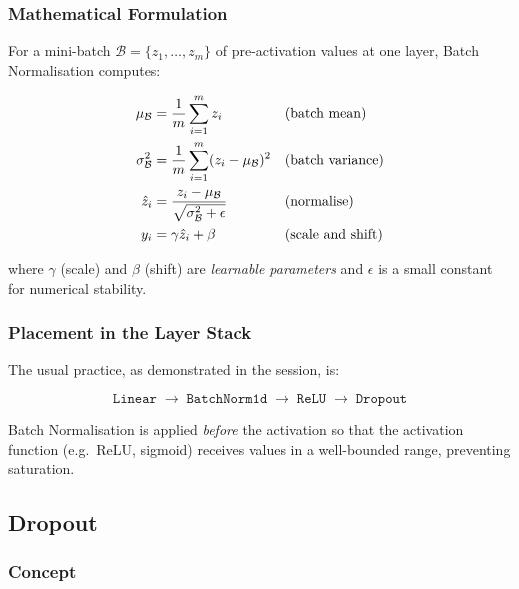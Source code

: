 \documentclass[12pt,a4paper]{article}
\begin{document}
\subsubsection{Mathematical Formulation}
\label{sec:regularisation:batchnorm:math}

For a mini-batch $\mathcal{B} = \{z_1, \ldots, z_m\}$ of pre-activation
values at one layer, Batch Normalisation \cite{ioffe2015batchnorm} computes:

\begin{align}
  \label{eq:batchnorm}
  \mu_\mathcal{B} &= \frac{1}{m}\sum_{i=1}^{m} z_i
    & &\text{(batch mean)} \notag \\
  \sigma^2_\mathcal{B} &= \frac{1}{m}\sum_{i=1}^{m}(z_i - \mu_\mathcal{B})^2
    & &\text{(batch variance)} \notag \\
  \hat{z}_i &= \frac{z_i - \mu_\mathcal{B}}
                    {\sqrt{\sigma^2_\mathcal{B} + \epsilon}}
    & &\text{(normalise)} \\
  y_i &= \gamma \hat{z}_i + \beta
    & &\text{(scale and shift)} \notag
\end{align}

where $\gamma$ (scale) and $\beta$ (shift) are \emph{learnable parameters}
and $\epsilon$ is a small constant for numerical stability.

\subsubsection{Placement in the Layer Stack}
\label{sec:regularisation:batchnorm:placement}

The usual practice, as demonstrated in the session, is:

\[
  \texttt{Linear} \;\longrightarrow\;
  \texttt{BatchNorm1d} \;\longrightarrow\;
  \texttt{ReLU} \;\longrightarrow\;
  \texttt{Dropout}
\]

Batch Normalisation is applied \emph{before} the activation so that the
activation function (e.g.\ ReLU, sigmoid) receives values in a well-bounded
range, preventing saturation.

\subsection{Dropout}
\label{sec:regularisation:dropout}

\subsubsection{Concept}
\label{sec:regularisation:dropout:concept}
\end{document}
